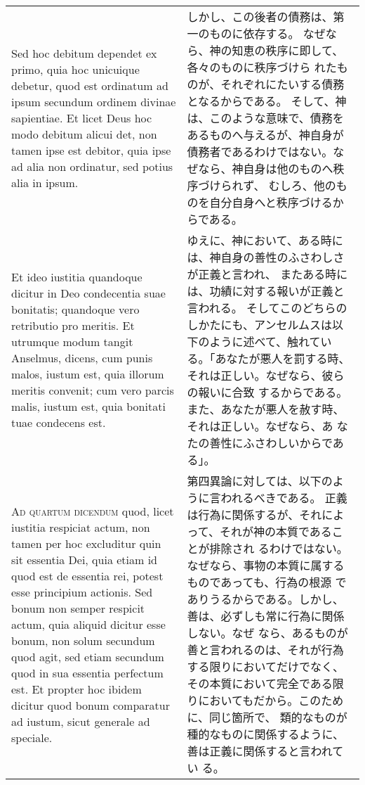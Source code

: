\documentclass[10pt]{jsarticle} %
\begin{document}
{\begin{longtable}{p{21em}p{21em}}
\\


 Sed hoc debitum dependet ex primo, quia hoc unicuique
debetur, quod est ordinatum ad ipsum secundum ordinem divinae
sapientiae. Et licet Deus hoc modo debitum alicui det, non tamen ipse
est debitor, quia ipse ad alia non ordinatur, sed potius alia in
ipsum. 


&



しかし、この後者の債務は、第一のものに依存する。
なぜなら、神の知恵の秩序に即して、各々のものに秩序づけら
 れたものが、それぞれにたいする債務となるからである。
そして、神は、このような意味で、債務をあるものへ与えるが、神自身が
債務者であるわけではない。なぜなら、神自身は他のものへ秩序づけられず、
 むしろ、他のものを自分自身へと秩序づけるからである。

\\


Et ideo iustitia quandoque dicitur in Deo condecentia suae
bonitatis; quandoque vero retributio pro meritis. Et utrumque modum
tangit Anselmus, dicens, cum punis malos, iustum est, quia illorum
meritis convenit; cum vero parcis malis, iustum est, quia bonitati tuae
condecens est.

&

ゆえに、神において、ある時には、神自身の善性のふさわしさが正義と言われ、
 またある時には、功績に対する報いが正義と言われる。
そしてこのどちらのしかたにも、アンセルムスは以下のように述べて、触れてい
 る。「あなたが悪人を罰する時、それは正しい。なぜなら、彼らの報いに合致
 するからである。また、あなたが悪人を赦す時、それは正しい。なぜなら、あ
 なたの善性にふさわしいからである」。


\\


{\scshape Ad quartum dicendum} quod, licet iustitia
respiciat actum, non tamen per hoc excluditur quin sit essentia Dei,
quia etiam id quod est de essentia rei, potest esse principium
actionis. Sed bonum non semper respicit actum, quia aliquid dicitur esse
bonum, non solum secundum quod agit, sed etiam secundum quod in sua
essentia perfectum est. Et propter hoc ibidem dicitur quod bonum
comparatur ad iustum, sicut generale ad speciale.

&

第四異論に対しては、以下のように言われるべきである。
正義は行為に関係するが、それによって、それが神の本質であることが排除され
 るわけではない。なぜなら、事物の本質に属するものであっても、行為の根源
 でありうるからである。しかし、善は、必ずしも常に行為に関係しない。なぜ
 なら、あるものが善と言われるのは、それが行為する限りにおいてだけでなく、
 その本質において完全である限りにおいてもだから。このために、同じ箇所で、
 類的なものが種的なものに関係するように、善は正義に関係すると言われてい
 る。





\end{longtable}}
\end{document}
